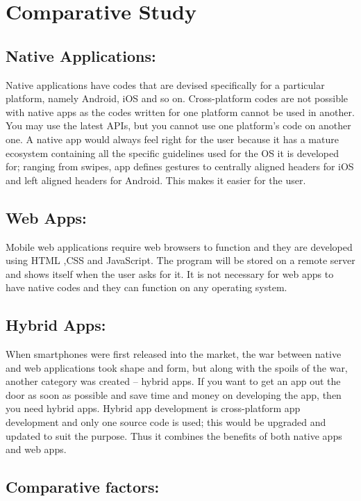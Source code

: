 \documentclass[14pt,a4paper,final]{extreport}
\begin{document}
 

\chapter{Comparative Study}
\section{Native Applications:}
 
\item
Native applications have codes that are devised specifically for a particular platform, namely Android, iOS and so on. Cross-platform codes are not possible with native apps as the codes written for one platform cannot be used in another. You may use the latest APIs, but you cannot use one platform’s code on another one. A native app would always feel right for the user because it has a mature ecosystem containing all the specific guidelines used for the OS it is developed for; ranging from swipes, app defines gestures to centrally aligned headers for iOS and left aligned headers for Android. This makes it easier for the user.
\section{Web Apps:}
\item 
Mobile web applications require web browsers to function and they are developed using HTML ,CSS and JavaScript. The program will be stored on a remote server and shows itself when the user asks for it. It is not necessary for web apps to have native codes and they can function on any operating system.
\section{Hybrid Apps:}
\item When smartphones were first released into the market, the war between native and web applications took shape and form, but along with the spoils of the war, another category was created – hybrid apps. If you want to get an app out the door as soon as possible and save time and money on developing the app, then you need hybrid apps. Hybrid app development is cross-platform app development and only one source code is used; this would be upgraded and updated to suit the purpose. Thus it combines the benefits of both native apps and web apps.
\section{Comparative factors:}
\end{document}
